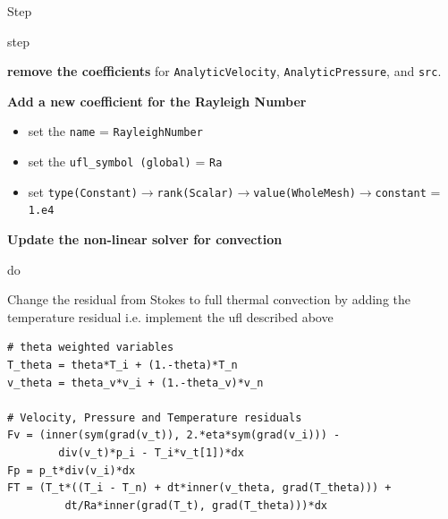 \begin{steps}{Step}
\begin{steps}{step}
    \item \textbf{remove the coefficients} for \texttt{AnalyticVelocity},
      \texttt{AnalyticPressure}, and \texttt{src}.
    \item \textbf{Add a new coefficient for the Rayleigh Number}
      \begin{itemize}
      \item set the \texttt{name} = \texttt{RayleighNumber}
      \item set the \texttt{ufl\_symbol (global)} = \texttt{Ra}
      \item set
        \texttt{type(Constant)}$\rightarrow$\texttt{rank(Scalar)}$\rightarrow$\texttt{value(WholeMesh)}$\rightarrow$\texttt{constant}
        = \texttt{1.e4}
      \end{itemize}
    \item \textbf{Update the non-linear solver for convection}
    \begin{steps}{do}
    \item Change the residual from Stokes to full   thermal convection
      by adding the temperature residual i.e. implement the ufl
      described above 
    \begin{lstlisting}[style=UFL]
# theta weighted variables
T_theta = theta*T_i + (1.-theta)*T_n
v_theta = theta_v*v_i + (1.-theta_v)*v_n

# Velocity, Pressure and Temperature residuals
Fv = (inner(sym(grad(v_t)), 2.*eta*sym(grad(v_i))) - 
        div(v_t)*p_i - T_i*v_t[1])*dx
Fp = p_t*div(v_i)*dx
FT = (T_t*((T_i - T_n) + dt*inner(v_theta, grad(T_theta))) + 
         dt/Ra*inner(grad(T_t), grad(T_theta)))*dx


\end{lstlisting}
\end{steps}
\end{steps}
\end{steps}
